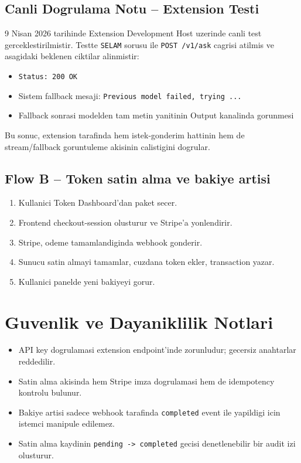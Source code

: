 \documentclass[11pt,a4paper]{article}
\begin{document}
\subsection{Canli Dogrulama Notu -- Extension Testi}

9 Nisan 2026 tarihinde Extension Development Host uzerinde canli test gerceklestirilmistir.
Testte \texttt{SELAM} sorusu ile \texttt{POST /v1/ask} cagrisi atilmis ve asagidaki beklenen ciktilar alinmistir:

\begin{itemize}[leftmargin=1.5em]
	\item \texttt{Status: 200 OK}
	\item Sistem fallback mesaji: \texttt{Previous model failed, trying ...}
	\item Fallback sonrasi modelden tam metin yanitinin Output kanalinda gorunmesi
\end{itemize}

Bu sonuc, extension tarafinda hem istek-gonderim hattinin hem de stream/fallback goruntuleme akisinin calistigini dogrular.

\subsection{Flow B -- Token satin alma ve bakiye artisi}

\begin{enumerate}[leftmargin=1.5em]
	\item Kullanici Token Dashboard'dan paket secer.
	\item Frontend checkout-session olusturur ve Stripe'a yonlendirir.
	\item Stripe, odeme tamamlandiginda webhook gonderir.
	\item Sunucu satin almayi tamamlar, cuzdana token ekler, transaction yazar.
	\item Kullanici panelde yeni bakiyeyi gorur.
\end{enumerate}

\section{Guvenlik ve Dayaniklilik Notlari}

\begin{itemize}[leftmargin=1.5em]
	\item API key dogrulamasi extension endpoint'inde zorunludur; gecersiz anahtarlar reddedilir.
	\item Satin alma akisinda hem Stripe imza dogrulamasi hem de idempotency kontrolu bulunur.
	\item Bakiye artisi sadece webhook tarafinda \texttt{completed} event ile yapildigi icin istemci manipule edilemez.
	\item Satin alma kaydinin \texttt{pending -> completed} gecisi denetlenebilir bir audit izi olusturur.
\end{itemize}
\end{document}
